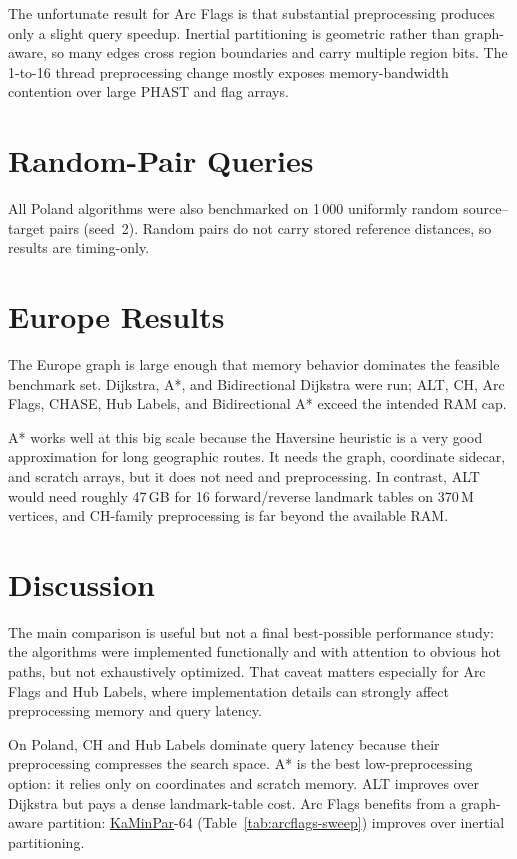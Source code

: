 \documentclass[11pt,a4paper]{article}
\begin{document}
The unfortunate result for Arc Flags is that substantial preprocessing produces
only a slight query speedup.  Inertial partitioning is geometric rather than
graph-aware, so many edges cross region boundaries and carry multiple region
bits.  The 1-to-16 thread preprocessing change mostly exposes memory-bandwidth
contention over large PHAST and flag arrays.

\section{Random-Pair Queries}
\label{sec:random-pairs}

All Poland algorithms were also benchmarked on 1\,000 uniformly random
source--target pairs (seed~2).  Random pairs do not carry stored reference
distances, so results are timing-only.




\section{Europe Results}
\label{sec:europe}

The Europe graph is large enough that memory behavior dominates the feasible
benchmark set.  Dijkstra, A*, and Bidirectional Dijkstra were run; ALT, CH,
Arc Flags, CHASE, Hub Labels, and Bidirectional A* exceed the intended RAM cap.



A* works well at this big scale because the Haversine heuristic is a very good approximation
for long geographic routes.  It needs the graph, coordinate sidecar, and scratch
arrays, but it does not need and preprocessing.  In contrast, ALT would
need roughly 47\,GB for 16 forward/reverse landmark tables on 370\,M vertices,
and CH-family preprocessing is far beyond the available RAM.

\section{Discussion}
\label{sec:discussion}

The main comparison is useful but not a final best-possible performance study:
the algorithms were implemented functionally and with attention to obvious hot
paths, but not exhaustively optimized.  That caveat matters especially for
Arc Flags and Hub Labels, where implementation details can strongly affect
preprocessing memory and query latency.

On Poland, CH and Hub Labels dominate query latency because their preprocessing
compresses the search space.  A* is the best low-preprocessing option: it
relies only on coordinates and scratch memory.  ALT improves over Dijkstra but
pays a dense landmark-table cost.  Arc Flags benefits from a graph-aware
partition: \href{https://github.com/KaHIP/KaMinPar}{KaMinPar}-64
(Table~\ref{tab:arcflags-sweep}) improves over inertial partitioning.
\end{document}
